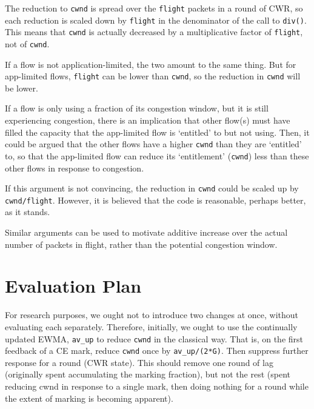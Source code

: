 The reduction to \texttt{cwnd} is spread over the \texttt{flight} packets in a
round of CWR, so each reduction is scaled down by \texttt{flight} in the
denominator of the call to \texttt{div()}. This means that \texttt{cwnd} is actually 
decreased by a multiplicative factor of
\texttt{flight}, not of \texttt{cwnd}.

If a flow is not application-limited, the two amount to the same thing. But for
app-limited flows, \texttt{flight} can be lower than \texttt{cwnd}, so the
reduction in \texttt{cwnd} will be lower.

If a flow is only using a fraction of its congestion window, but it is still
experiencing congestion, there is an implication that other flow(s) must have
filled the capacity that the app-limited flow is `entitled' to but not using.
Then, it could be argued that the other flows have a higher \texttt{cwnd} than
they are `entitled' to, so that the app-limited flow can reduce its
`entitlement' (\texttt{cwnd}) less than these other flows in response to
congestion.

If this argument is not convincing, the reduction in \texttt{cwnd} could be
scaled up by \texttt{cwnd/flight}. However, it is believed that the code is
reasonable, perhaps better, as it stands.

Similar arguments can be used to motivate additive increase over the actual
number of packets in flight, rather than the potential congestion window.

\section{Evaluation Plan}\label{prresp_Evaluation}

For research purposes, we ought not to introduce two changes at once, without
evaluating each separately. Therefore, initially, we ought to use the
continually updated EWMA, \texttt{av\_up} to reduce \texttt{cwnd} in the
classical way. That is, on the first feedback of a CE mark, reduce \texttt{cwnd}
once by \texttt{av\_up/(2*G)}. Then suppress further response for a round (CWR
state). This should remove one round of lag (originally spent accumulating the
marking fraction), but not the rest (spent reducing cwnd in response to a single
mark, then doing nothing for a round while the extent of marking is becoming
apparent).

